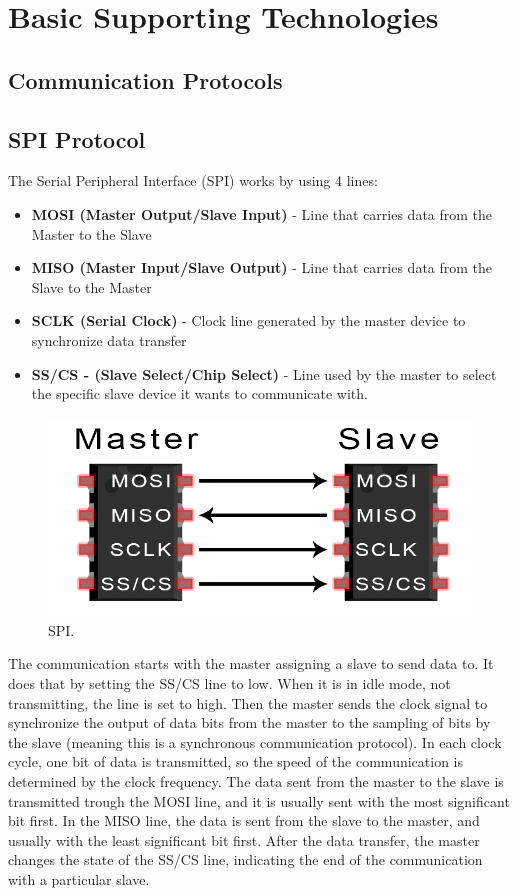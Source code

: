 \documentclass[english]{ist-thesis}
\begin{document}
\section{Basic Supporting Technologies}

\subsection{Communication Protocols}

\subsection{SPI Protocol}

The Serial Peripheral Interface (SPI) works by using 4 lines:

\begin{itemize}
  \item \textbf{MOSI (Master Output/Slave Input)} - Line that carries data from the Master to the Slave
  \item \textbf{MISO (Master Input/Slave Output)} - Line that carries data from the Slave to the Master
  \item \textbf{SCLK (Serial Clock)} - Clock line generated by the master device to synchronize data transfer
  \item \textbf{SS/CS - (Slave Select/Chip Select)} - Line used by the master to select the specific slave device it wants to communicate with.
\end{itemize}

\begin{figure}[ht]
	\centering
	\includegraphics[width = 0.5\linewidth]{images/protocolos/SPI_master_slave.png}
	\caption{SPI.}
	\label{fig:spi}
\end{figure}

The communication starts with the master assigning a slave to send data to. It does that by setting the SS/CS line to low. When it is  in idle mode, not transmitting, the line is set to high. Then the master sends the clock signal to synchronize the output of data bits from the master to the sampling of bits by the slave (meaning this is a synchronous communication protocol). In each clock cycle, one bit of data is transmitted, so the speed of the communication is determined by the clock frequency. The data sent from the master to the slave is transmitted trough the MOSI line, and it is usually sent with the most significant bit first. In the MISO line, the data is sent from the slave to the master, and usually with the least significant bit first. After the data transfer, the master changes the state of the SS/CS line, indicating the end of the communication with a particular slave. 
\end{document}
